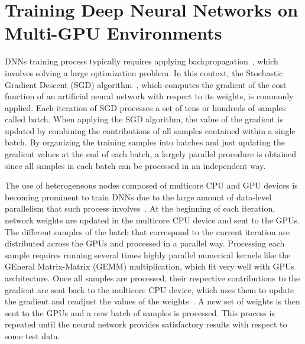 \section{Training Deep Neural Networks on Multi-GPU Environments}
\label{sec:background}
DNNs training process typically requires applying  
backpropagation~\cite{Werbos74}, which involves solving a 
large optimization problem.
In this context, the Stochastic Gradient Descent (SGD) algorithm~\cite{KieferWolfowitz1952}, 
which computes the gradient of the cost function of an artificial neural 
network with respect to its weights, is commonly applied.
Each iteration of SGD processes a set of tens or hundreds of samples called batch.
When applying the SGD algorithm, the value of the gradient is updated by combining 
the contributions of all samples contained within a single batch.
By organizing the training samples into batches and just updating the gradient 
values at the end of each batch, a largely parallel procedure is obtained since 
all samples in each batch can be processed in an independent way.

The use of heterogeneous nodes composed of multicore CPU and GPU devices 
is becoming prominent to train DNNs due to the large amount of 
data-level parallelism that such process involves~\cite{You17}.
At the beginning of each iteration, network weights are updated in the 
multicore CPU device and sent to the GPUs.
The different samples of the batch that correspond to the current iteration are 
distributed across the GPUs and processed in a parallel way.
Processing each sample requires running several times highly parallel numerical kernels like the 
GEneral Matrix-Matrix (GEMM) multiplication, which fit very well with GPUs architecture.
Once all samples are processed, their respective contributions to the gradient 
are sent back to the multicore CPU device, which uses them to update the gradient and  
readjust the values of the weights~\cite{jeff12}.
A new set of weights is then sent to the GPUs and a new batch of samples is processed. 
This process is repeated until the neural network provides 
satisfactory results with respect to some test data.


